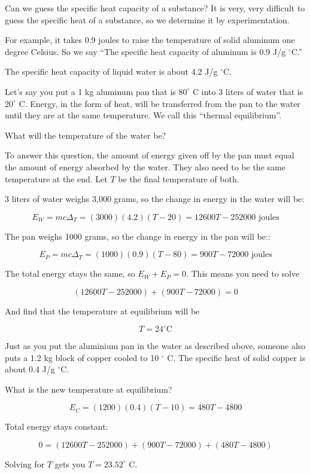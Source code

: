 Can we guess the specific heat capacity of a substance? It is very,
very difficult to guess the specific heat of a substance, so we determine
it by experimentation.

For example, it takes 0.9 joules to raise
the temperature of solid aluminum one degree Celsius. So we say ``The
specific heat capacity of aluminum is 0.9 J/g $^\circ$C.''

The specific heat capacity of liquid water is about 4.2 J/g $^\circ$C.

Let's say you put a 1 kg aluminum pan that is $80^\circ$ C into
3 liters of water that is $20^\circ$ C. Energy, in the form of heat,
will be transferred from the pan to the water until they are at the same
temperature. We call this ``thermal equilibrium''.

What will the temperature of the water be?

To answer this question, the amount of energy given off by the
pan must equal the amount of energy absorbed by the water. They also
need to be the same temperature at the end. Let $T$ be the final
temperature of both.

3 liters of water weighs 3,000 grams, so the
change in energy in the water will be:

$$E_W = m c \Delta_T = (3000)(4.2)(T - 20) = 12600T - 252000 \text{ joules}$$

The pan weighs 1000 grams, so the change in energy in the pan will be::

$$E_P = m c \Delta_T = (1000)(0.9)(T - 80) = 900T - 72000 \text{ joules}$$

The total energy stays the same, so $E_W + E_P = 0$. This means you need to solve

$$(12600T - 252000) + (900T - 72000) = 0$$

And find that the temperature at equilibrium will be

$$T = 24^\circ \text{C}$$

\begin{Exercise}[title={Thermal Equilibrium}, label=thermal_equilibrium]

Just as you put the aluminium pan in the water as described above,
someone also puts a 1.2 kg block of copper cooled to 10 $^\circ$ C.
The specific heat of solid copper is about 0.4 J/g $^\circ$C.

What is the new temperature at equilibrium?

\end{Exercise}
\begin{Answer}[ref=thermal_equilibrium]

  $$E_C = (1200)(0.4)(T - 10) = 480T - 4800$$

Total energy stays constant:

$$0 = (12600T - 252000) + (900T - 72000) + (480T - 4800)$$

Solving for $T$ gets you $T = 23.52^\circ$ C.

\end{Answer}

